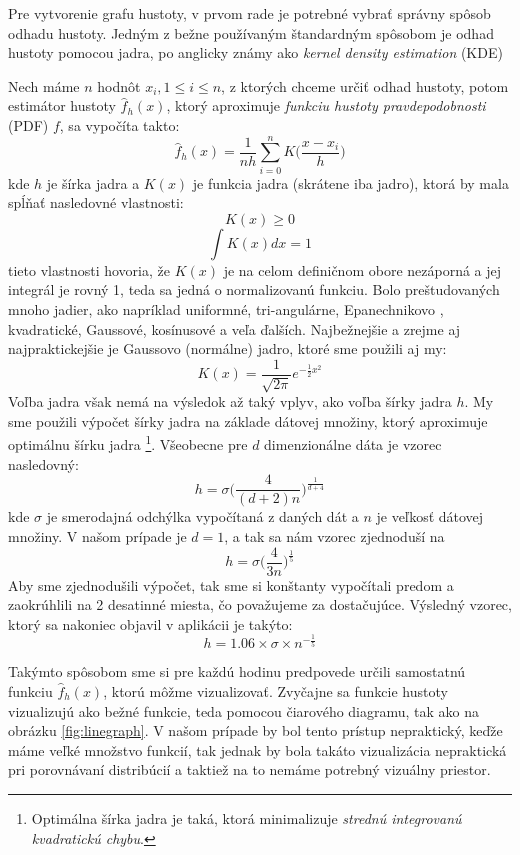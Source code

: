 Pre vytvorenie grafu hustoty, v prvom rade je potrebné vybrať správny spôsob odhadu hustoty. Jedným z bežne používaným štandardným spôsobom je odhad hustoty pomocou jadra, po anglicky známy ako \textit{kernel density estimation} (KDE) \cite{Rosenblatt, Parzen}

Nech máme $ n $ hodnôt $ x_{i}, 1 \leq i \leq n $, z ktorých chceme určiť odhad hustoty, potom estimátor hustoty $ \hat{f}_h(x) $, ktorý aproximuje \textit{funkciu hustoty pravdepodobnosti} (PDF) $ f $, sa vypočíta takto:
\[
	\hat{f}_h(x) = \dfrac{1}{nh} \sum_{i=0}^{n}K\Big(\dfrac{x - x_{i}}{h}\Big)
\]
kde $ h $ je šírka jadra a $ K(x) $ je funkcia jadra (skrátene iba jadro), ktorá by mala spĺňať nasledovné vlastnosti:
\[  K(x) \geq 0 \]
\[  \int K(x) dx = 1 \]
tieto vlastnosti hovoria, že $ K(x) $ je na celom definičnom obore nezáporná a jej integrál je rovný 1, teda sa jedná o normalizovanú funkciu. Bolo preštudovaných mnoho jadier, ako napríklad uniformné, tri-angulárne, Epanechnikovo \cite{Turlach}, kvadratické, Gaussové, kosínusové a veľa ďalších. Najbežnejšie a zrejme aj najpraktickejšie \cite{Minnotte} je Gaussovo (normálne) jadro, ktoré sme použili aj my:
\[
	K(x) = \dfrac{1}{\sqrt{2\pi}}e^{-\frac{1}{2}x^2}
\]
Voľba jadra však nemá na výsledok až taký vplyv, ako voľba šírky jadra $ h $. My sme použili výpočet šírky jadra na základe dátovej množiny, ktorý aproximuje optimálnu šírku jadra \cite{Scott, BowmanAzzalani} \footnote{Optimálna šírka jadra je taká, ktorá minimalizuje \textit{strednú integrovanú kvadratickú chybu}.}. Všeobecne pre $ d $ dimenzionálne dáta je vzorec nasledovný:
\[
	h = \sigma \Big(\frac{4}{(d + 2)n}\Big)^{\frac{1}{d+4}}
\]
kde $ \sigma $ je smerodajná odchýlka vypočítaná z daných dát a $ n $ je veľkosť dátovej množiny. V našom prípade je $ d = 1 $, a tak sa nám vzorec zjednoduší na
\[
	h = \sigma \Big(\dfrac{4}{3n}\Big)^{\frac{1}{5}}
\] 
Aby sme zjednodušili výpočet, tak sme si konštanty vypočítali predom a zaokrúhlili na 2 desatinné miesta, čo považujeme za dostačujúce. Výsledný vzorec, ktorý sa nakoniec objavil v aplikácii je takýto:
\[
	h = 1.06 \times \sigma \times n^{-\frac{1}{5}}
\]

Takýmto spôsobom sme si pre každú hodinu predpovede určili samostatnú funkciu $ \hat{f}_{h}(x) $, ktorú môžme vizualizovať. Zvyčajne sa funkcie hustoty vizualizujú ako bežné funkcie, teda pomocou čiarového diagramu, tak ako na obrázku \ref{fig:linegraph}. V našom prípade by bol tento prístup nepraktický, keďže máme veľké množstvo funkcií, tak jednak by bola takáto vizualizácia nepraktická pri porovnávaní distribúcií a taktiež na to nemáme potrebný vizuálny priestor.

